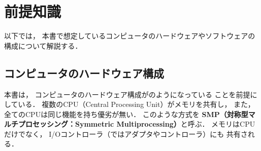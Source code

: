 \chapter{前提知識}
以下では，
本書で想定しているコンピュータのハードウェアやソフトウェアの
構成について解説する．

\section{コンピュータのハードウェア構成}
本書は，
コンピュータのハードウェア構成がのようになっている
ことを前提にしている．
複数のCPU（Central Processing Unit）がメモリを共有し，
また，全てのCPUは同じ機能を持ち優劣が無い．
このような方式を
{\bf SMP（対称型マルチプロセッシング：Symmetric Multiprocessing）}と呼ぶ．
メモリはCPUだけでなく，
I/Oコントローラ（ではアダプタやコントローラ）にも
共有される．


